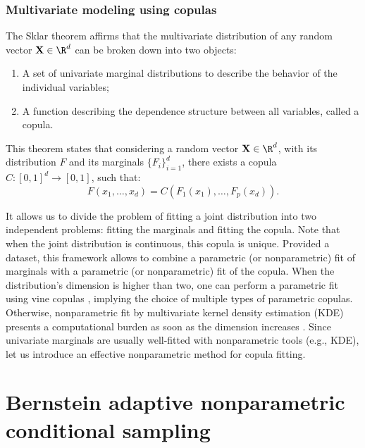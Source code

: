 \subsubsection{Multivariate modeling using copulas}
The  Sklar theorem \citep{joe_1997} affirms that the multivariate distribution of any random vector $\mathbf{X} \in \R^d$ can be broken down into two objects:
\begin{enumerate}
    \item A set of univariate marginal distributions to describe the behavior of the individual variables;
    \item A function describing the dependence structure between all variables, called a copula. 
\end{enumerate}
This theorem states that considering a random vector $\mathbf{X} \in \R^d$, with its distribution $F$ and its marginals $\{F_i\}_{i=1}^d$, there exists a copula $C: [0, 1]^d \rightarrow [0, 1]$, such that:
\begin{equation}
    F(x_1, \dots, x_d) = C\left(F_1(x_1), \dots, F_p(x_d)\right). 
\end{equation}

It allows us to divide the problem of fitting a joint distribution into two independent problems: fitting the marginals and fitting the copula. 
Note that when the joint distribution is continuous, this copula is unique. 
Provided a dataset, this framework allows to combine a parametric (or nonparametric) fit of marginals with a parametric (or nonparametric) fit of the copula. 
When the distribution's dimension is higher than two, one can perform a parametric fit using vine copulas \citep{joe2011dependence}, implying the choice of multiple types of parametric copulas. 
Otherwise, nonparametric fit by multivariate kernel density estimation (KDE) presents a computational burden as soon as the dimension increases \citep{chabridon2021global}. 
Since univariate marginals are usually well-fitted with nonparametric tools (e.g., KDE), let us introduce an effective nonparametric method for copula fitting.


\section{Bernstein adaptive nonparametric conditional sampling}

